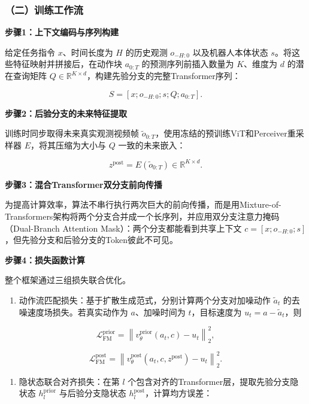 \hypertarget{ux4e8cux8badux7ec3ux5de5ux4f5cux6d41}{%
\subsubsection{（二）训练工作流}\label{ux4e8cux8badux7ec3ux5de5ux4f5cux6d41}}

\textbf{步骤1：上下文编码与序列构建}

给定任务指令 \(x\)、时间长度为 \(H\) 的历史观测 \(o_{-H:0}\) 以及机器人本体状态 \(s\)。将这些特征映射并拼接后，在动作块 \(a_{0:T}\) 的预测序列前插入数量为 \(K\)、维度为 \(d\) 的潜在查询矩阵 \(Q\in\mathbb{R}^{K\times d}\)，构建先验分支的完整Transformer序列：

\[
S=[x;o_{-H:0};s;Q;a_{0:T}].
\]

\textbf{步骤2：后验分支的未来特征提取}

训练时同步取得未来真实观测视频帧 \(\tilde{o}_{0:T}\)，使用冻结的预训练ViT和Perceiver重采样器 \(E\)，将其压缩为大小与 \(Q\) 一致的未来嵌入：

\[
z^{\mathrm{post}}=E(\tilde{o}_{0:T})\in\mathbb{R}^{K\times d}.
\]

\textbf{步骤3：混合Transformer双分支前向传播}

为提高计算效率，算法不串行执行两次巨大的前向传播，而是用Mixture-of-Transformers架构将两个分支合并成一个长序列，并应用双分支注意力掩码（Dual-Branch Attention Mask）：两个分支都能看到共享上下文 \(c=[x;o_{-H:0};s]\)，但先验分支和后验分支的Token彼此不可见。

\textbf{步骤4：损失函数计算}

整个框架通过三组损失联合优化。

\begin{enumerate}
\def\labelenumi{\arabic{enumi}.}
\tightlist
\item
  动作流匹配损失：基于扩散生成范式，分别计算两个分支对加噪动作 \(\tilde a_t\) 的去噪速度场损失。若真实动作为 \(a\)、加噪时间为 \(t\)，目标速度为 \(u_t=a-\tilde a_t\)，则
\end{enumerate}

\[
\mathcal{L}_{\mathrm{FM}}^{\mathrm{prior}}=\left\|v_\theta^{\mathrm{prior}}(a_t,c)-u_t\right\|_2^2,
\]

\[
\mathcal{L}_{\mathrm{FM}}^{\mathrm{post}}=\left\|v_\theta^{\mathrm{post}}(a_t,c,z^{\mathrm{post}})-u_t\right\|_2^2.
\]

\begin{enumerate}
\def\labelenumi{\arabic{enumi}.}
\setcounter{enumi}{1}
\tightlist
\item
  隐状态联合对齐损失：在第 \(l\) 个包含对齐的Transformer层，提取先验分支隐状态 \(h_l^{\mathrm{prior}}\) 与后验分支隐状态 \(h_l^{\mathrm{post}}\)，计算均方误差：
\end{enumerate}

